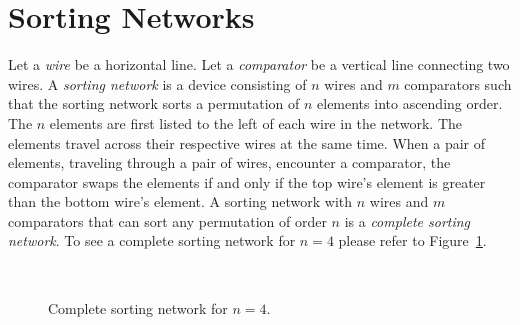 
\section{Sorting Networks}
Let a \emph{wire} be a horizontal line. Let a \emph{comparator} be a vertical line connecting two wires. A 
\emph{sorting network} is a device consisting of $n$ wires and $m$  
comparators such that the sorting network sorts a permutation of $n$ elements into ascending order. The 
$n$ elements are first listed to the left of each wire in the network. The elements travel across their respective wires 
at the same time. When a pair of elements, traveling through a pair of wires, 
encounter a comparator, the comparator swaps the elements if and only if the top wire's element 
is greater than the bottom wire's element. A sorting network with $n$ wires and $m$ 
comparators that can sort any permutation of order $n$ is a \emph{complete sorting network}. 
To see a complete sorting network for $n=4$ please refer to Figure~\ref{Fig:SortNetwork}.\par 

\begin{figure}[h]
   ~\centering
    \caption{Complete sorting network for $n=4$.}
    \label{Fig:SortNetwork}
\end{figure}


